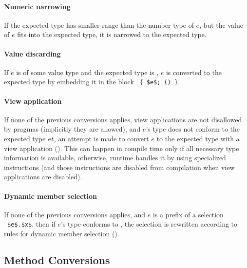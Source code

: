 \paragraph{Numeric narrowing}
If the expected type has smaller range than the number type of $e$, but the value of $e$ fits into the expected type, it is narrowed to the expected type. 

\paragraph{Value discarding}
If $e$ is of some value type and the expected type is , $e$ is converted to the expected type by embedding it in the block ~\lstinline!{ $e$; () }!. 

\paragraph{View application}
If none of the previous conversions applies, view applications are not disallowed by pragmas (implicitly they are allowed), and $e$'s type does not conform to the expected type $\mbox{\sl et}$, an attempt is made to convert $e$ to the expected type with a view application (). This can happen in compile time only if all necessary type information is available, otherwise, runtime handles it by using specialized instructions (and those instructions are disabled from compilation when view applications are disabled). 

\paragraph{Dynamic member selection}
If none of the previous conversions applies, and $e$ is a prefix of a selection ~\lstinline!$e$.$x$!, then if $e$'s type conforms to , the selection is rewritten according to rules for dynamic member selection (). 






\subsection{Method Conversions}
\label{sec:method-conversions}

